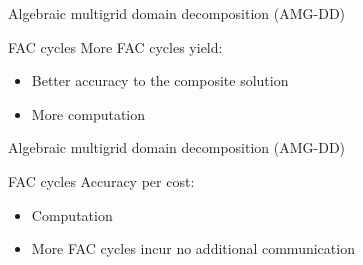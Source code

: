 \documentclass[18pt,xcolor=table]{beamer}
\begin{document}
\begin{frame}{Algebraic multigrid domain decomposition (AMG-DD)}
\begin{block}{FAC cycles}
More FAC cycles yield:
\begin{itemize}
   \item Better accuracy to the composite solution
   \item More computation
\end{itemize}
\end{block}

\centering
\vspace{0.5 cm}

\end{frame}

\begin{frame}{Algebraic multigrid domain decomposition (AMG-DD)}
\begin{block}{FAC cycles}
Accuracy per cost:
\begin{itemize}
   \item Computation
   \item More FAC cycles incur no additional communication
\end{itemize}
\end{block}

\centering
\vspace{0.5 cm}

\end{frame}
\end{document}
